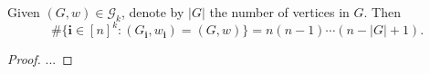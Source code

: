 \begin{lemma}
  \label{lem:}
  \notready
  \uses{}
  Given $(G,w) \in \mathcal{G}_k$, denote by $|G|$ the number of vertices in $G$. Then
  $$\# \{ \mathbf{i} \in [n]^k : (G_\mathbf{i},w_\mathbf{i}) = (G,w) \} = n (n-1) \cdots (n - |G| + 1).$$ 
\end{lemma}

\begin{proof}
  \notready
  ...
\end{proof}























\fi

